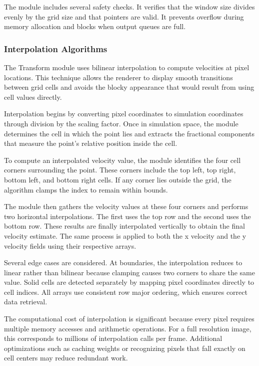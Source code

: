 \documentclass[12pt,a4paper]{article}
\begin{document}
The module includes several safety checks. It verifies that the window size divides evenly by the grid size and that pointers are valid. It prevents overflow during memory allocation and blocks when output queues are full.

\subsubsection{Interpolation Algorithms}

The Transform module uses bilinear interpolation to compute velocities at pixel locations. This technique allows the renderer to display smooth transitions between grid cells and avoids the blocky appearance that would result from using cell values directly.

Interpolation begins by converting pixel coordinates to simulation coordinates through division by the scaling factor. Once in simulation space, the module determines the cell in which the point lies and extracts the fractional components that measure the point’s relative position inside the cell.

To compute an interpolated velocity value, the module identifies the four cell corners surrounding the point. These corners include the top left, top right, bottom left, and bottom right cells. If any corner lies outside the grid, the algorithm clamps the index to remain within bounds.

The module then gathers the velocity values at these four corners and performs two horizontal interpolations. The first uses the top row and the second uses the bottom row. These results are finally interpolated vertically to obtain the final velocity estimate. The same process is applied to both the x velocity and the y velocity fields using their respective arrays.

Several edge cases are considered. At boundaries, the interpolation reduces to linear rather than bilinear because clamping causes two corners to share the same value. Solid cells are detected separately by mapping pixel coordinates directly to cell indices. All arrays use consistent row major ordering, which ensures correct data retrieval.

The computational cost of interpolation is significant because every pixel requires multiple memory accesses and arithmetic operations. For a full resolution image, this corresponds to millions of interpolation calls per frame. Additional optimizations such as caching weights or recognizing pixels that fall exactly on cell centers may reduce redundant work.
\end{document}
